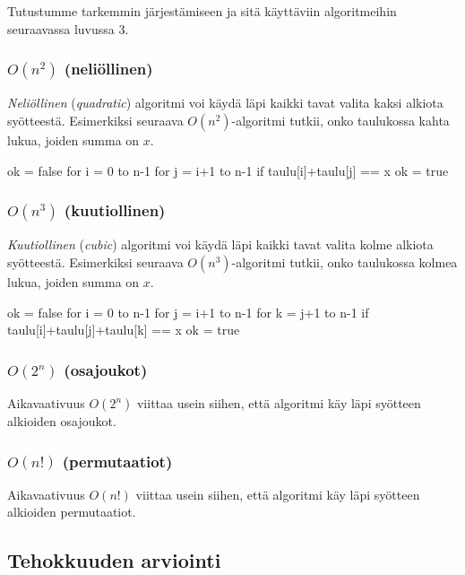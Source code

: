 Tutustumme tarkemmin järjestämiseen ja sitä käyttäviin
algoritmeihin seuraavassa luvussa 3.


\subsubsection{$O(n^2)$ (neliöllinen)}

\emph{Neliöllinen} (\emph{quadratic}) algoritmi voi käydä läpi kaikki tavat valita
kaksi alkiota syöt\-teestä.
Esimerkiksi seuraava $O(n^2)$-algoritmi tutkii, onko taulukossa
kahta lukua, joiden summa on $x$.

\begin{code}
    ok = false
    for i = 0 to n-1
    for j = i+1 to n-1
    if taulu[i]+taulu[j] == x
    ok = true
\end{code}


\subsubsection{$O(n^3)$ (kuutiollinen)}

\emph{Kuutiollinen} (\emph{cubic}) algoritmi voi käydä läpi kaikki tavat valita
kolme alkiota syöt\-teestä.
Esimerkiksi seuraava $O(n^3)$-algoritmi tutkii, onko taulukossa
kolmea lukua, joiden summa on $x$.

\begin{code}
    ok = false
    for i = 0 to n-1
    for j = i+1 to n-1
    for k = j+1 to n-1
    if taulu[i]+taulu[j]+taulu[k] == x
    ok = true
\end{code}

\subsubsection{$O(2^n)$ (osajoukot)}

Aikavaativuus $O(2^n)$ viittaa usein siihen,
että algoritmi käy läpi syötteen alkioiden osajoukot.

\subsubsection{$O(n!)$ (permutaatiot)}

Aikavaativuus $O(n!)$ viittaa usein siihen,
että algoritmi käy läpi syötteen alkioiden permutaatiot.

\subsection{Tehokkuuden arviointi}


